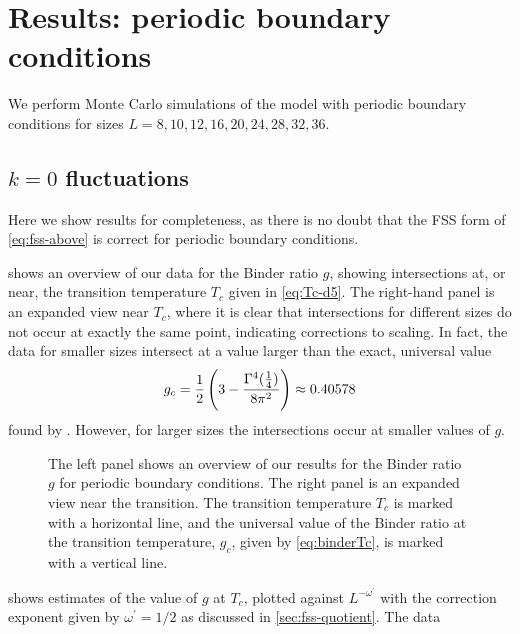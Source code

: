 \section{Results: periodic boundary conditions}
\label{sec:fss-results-pbc}

We perform Monte Carlo simulations of the model with periodic boundary
conditions for sizes $L=8,10,12,16,20,24,28,32,36$.

\subsection{$k=0$ fluctuations}

Here we show results for completeness, as there is no doubt that the FSS form
of \cref{eq:fss-above} is correct for periodic boundary conditions.

 shows an overview of our data for the Binder ratio $g$,
showing intersections at, or near, the transition temperature $T_c$ given in
\cref{eq:Tc-d5}. The right-hand panel is an expanded view near $T_c$, where it
is clear that intersections for different sizes do not occur at exactly the
same point, indicating corrections to scaling. In fact, the data for smaller
sizes intersect at a value larger than the exact, universal value
\begin{equation}
  g_c =
  \frac{1}{2}\left(3 - \frac{\Gamma^4(\frac{1}{4})}{8\pi^2}\right) \approx
  0.40578
  \label{eq:binderTc}
\end{equation}
found by \textcite{brezin1985finite}. However, for larger sizes the
intersections occur at smaller values of $g$.
\begin{figure}
  \centering
  
  
  \caption[
    Data for the Binder ratio $g$ for the five-dimensional Ising model with
    periodic boundary conditions.
  ]
  {
    The left panel shows an overview of our results for the Binder ratio $g$
    for periodic boundary conditions. The right panel is an expanded view near
    the transition. The transition temperature $T_c$ is marked with a
    horizontal line, and the universal value of the Binder ratio at the
    transition temperature, $g_c$, given by \cref{eq:binderTc}, is marked with
    a vertical line.
  } \label{fig:binder-p}
\end{figure}
 shows estimates of the value of $g$ at $T_c$, plotted against
$L^{-\omega^{\prime}}$ with the correction exponent given by
$\omega^{\prime}=1/2$ as discussed in \cref{sec:fss-quotient}. The data
